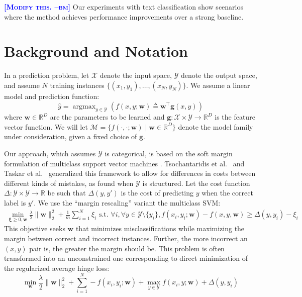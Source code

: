 \documentclass{article} %
\DeclareMathOperator*{\argmax}{argmax}
\newcommand{\bmcomment}[1]{\textcolor{blue}{\textsc{\textbf{[#1 --bm]}}}}
\begin{document}
\bmcomment{Modify this.}
Our experiments with text classification show  scenarios where the method achieves
performance improvements over a strong baseline.


\section{Background and Notation}

In a prediction problem, let $\mathcal{X}$ denote the input space,
$\mathcal{Y}$ denote the output space, and assume $N$ training
instances $\{(x_1, y_1), \ldots, (x_N, y_N)\}$.  We assume a linear
model and prediction function:
\begin{equation}
\hat{y} = \argmax_{y \in \mathcal{Y}} \left(f(x, y;\mathbf{w}) \triangleq \mathbf{w}^\top \mathbf{g}(x, y) \right)
\end{equation}
where $\mathbf{w} \in \mathbb{R}^D$ are the parameters to be learned
and $\mathbf{g} : \mathcal{X} \times \mathcal{Y} \rightarrow
\mathbb{R}^D$ is the feature vector function.  We will let
$\mathcal{M} =\{f(\cdot,\cdot;\mathbf{w}) \mid \mathbf{w} \in
\mathbb{R}^D\}$ denote the model family under consideration, given a
fixed choice of $\mathbf{g}$.

Our approach, which assumes $\mathcal{Y}$ is categorical, is based on
the soft margin formulation of multiclass support vector machines
\citep{vapnik1998statistical,crammer2002algorithmic,weston1998multi}.
Tsochantaridis et al.~\citep{tsochantaridis2004support} and Taskar et
al.~\citep{koller2003max} generalized this framework to allow for
differences in costs between different kinds of mistakes, as found
when $\mathcal{Y}$ is structured.  Let the cost function
$\Delta:\mathcal{Y}\times\mathcal{Y}\rightarrow\mathbb{R}$  be such
that $\Delta(y, y')$ is the cost of predicting $y$ when the correct
label is $y'$.  We use the ``margin rescaling'' variant the multiclass SVM:
\begin{align}
 \min_{\boldsymbol{\xi}\geq 0, \mathbf{w}}
\frac{\lambda}{2}\|\mathbf{w}\|_2^2+\frac{1}{m}\sum_{i=1}^N\xi_i 
 \text{\ \ \ s.t.\ \ \ } \forall i,  \forall y \in \mathcal{Y} \setminus
 \{y_i\},  f(x_i, y_i; \mathbf{w}) - f(x, y, \mathbf{w}) \geq
 \Delta(y, y_i) - \xi_i \label{marginRescaling}
\end{align}
This objective seeks $\mathbf{w}$ that minimizes misclassifications while
maximizing the margin between correct and incorrect instances.
Further, the more incorrect an $(x,y)$ pair is, the greater the margin
should be.  This problem is often transformed into an unconstrained
one corresponding to direct minimization of the regularized average
hinge loss:
\begin{equation}
\label{svmObjective}
\min_{\mathbf{w}} \frac{\lambda}{2}\|\mathbf{w}\|_2^2 +
\sum_{i=1}^N  -f(x_i, y_i; \mathbf{w}) + \max_{y \in \mathcal{Y}}
  f(x_i, y; \mathbf{w}) + \Delta(y, y_i)
\end{equation}
\end{document}
